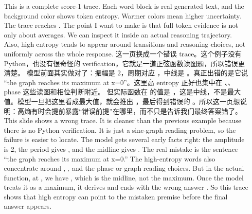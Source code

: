 {}\markdownRendererInterblockSeparator
{}This is a complete score-1 trace. Each word block is real generated text, and the background color shows token entropy. Warmer colors mean higher uncertainty.\markdownRendererInterblockSeparator
{}The trace reaches . The point I want to make is that full-token evidence is not only about averages. We can inspect it inside an actual reasoning trajectory. Also, high entropy tends to appear around transitions and reasoning choices, not uniformly across the whole response.\markdownRendererInterblockSeparator
{}\markdownRendererHorizontalRule{}\markdownRendererInterblockSeparator
{}\markdownRendererInterblockSeparator
{}\markdownRendererInterblockSeparator
{}这一页换成一个错误 trace。这个例子没有 Python，也没有很奇怪的 verification，它就是一道正弦函数读图题，所以错误更清楚。\markdownRendererInterblockSeparator
{}模型前面其实做对了：振幅是 2，周期对应 ，中线是 。真正出错的是它说 “the graph reaches its maximum at x=0”。这里高 entropy 正好也集中在 、、phase 这些读图和相位判断附近。\markdownRendererInterblockSeparator
{}但实际函数在  的值是 ，这是中线，不是最大值。模型一旦把这里看成最大值，就会推出 ，最后得到错误的 。所以这一页想说明：高熵有时会提前暴露“错误前提”在哪里，而不只是告诉我们最终答案错了。\markdownRendererInterblockSeparator
{}\markdownRendererInterblockSeparator
{}This slide shows a wrong trace. It is cleaner than the previous example because there is no Python verification. It is just a sine-graph reading problem, so the failure is easier to locate.\markdownRendererInterblockSeparator
{}The model gets several early facts right: the amplitude is 2, the period gives , and the midline gives . The real mistake is the sentence “the graph reaches its maximum at x=0.” The high-entropy words also concentrate around , , and the phase or graph-reading choices.\markdownRendererInterblockSeparator
{}But in the actual function, at , we have , which is the midline, not the maximum. Once the model treats it as a maximum, it derives  and ends with the wrong answer . So this trace shows that high entropy can point to the mistaken premise before the final answer appears.\markdownRendererInterblockSeparator
